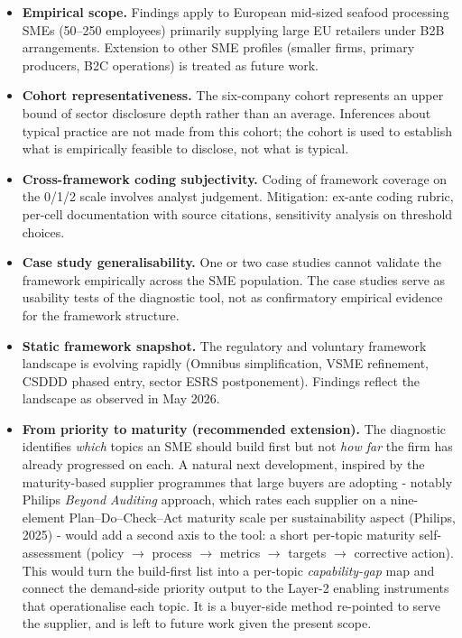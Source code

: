 \documentclass[
]{article}
\begin{document}
\begin{itemize}
\item
  \textbf{Empirical scope.} Findings apply to European mid-sized seafood
  processing SMEs (50--250 employees) primarily supplying large EU
  retailers under B2B arrangements. Extension to other SME profiles
  (smaller firms, primary producers, B2C operations) is treated as
  future work.
\item
  \textbf{Cohort representativeness.} The six-company cohort represents
  an upper bound of sector disclosure depth rather than an average.
  Inferences about typical practice are not made from this cohort; the
  cohort is used to establish what is empirically feasible to disclose,
  not what is typical.
\item
  \textbf{Cross-framework coding subjectivity.} Coding of framework
  coverage on the 0/1/2 scale involves analyst judgement. Mitigation:
  ex-ante coding rubric, per-cell documentation with source citations,
  sensitivity analysis on threshold choices.
\item
  \textbf{Case study generalisability.} One or two case studies cannot
  validate the framework empirically across the SME population. The case
  studies serve as usability tests of the diagnostic tool, not as
  confirmatory empirical evidence for the framework structure.
\item
  \textbf{Static framework snapshot.} The regulatory and voluntary
  framework landscape is evolving rapidly (Omnibus simplification, VSME
  refinement, CSDDD phased entry, sector ESRS postponement). Findings
  reflect the landscape as observed in May 2026.
\item
  \textbf{From priority to maturity (recommended extension).} The
  diagnostic identifies \emph{which} topics an SME should build first but
  not \emph{how far} the firm has already progressed on each. A natural
  next development, inspired by the maturity-based supplier programmes that
  large buyers are adopting - notably Philips\textquotesingle{}
  \emph{Beyond Auditing} approach, which rates each supplier on a
  nine-element Plan--Do--Check--Act maturity scale per sustainability
  aspect (Philips, 2025) - would add a second axis to the tool: a short
  per-topic maturity self-assessment (policy $\to$ process $\to$ metrics
  $\to$ targets $\to$ corrective action). This would turn the build-first
  list into a per-topic \emph{capability-gap} map and connect the
  demand-side priority output to the Layer-2 enabling instruments that
  operationalise each topic. It is a buyer-side method re-pointed to serve
  the supplier, and is left to future work given the present scope.
\end{itemize}
\end{document}
